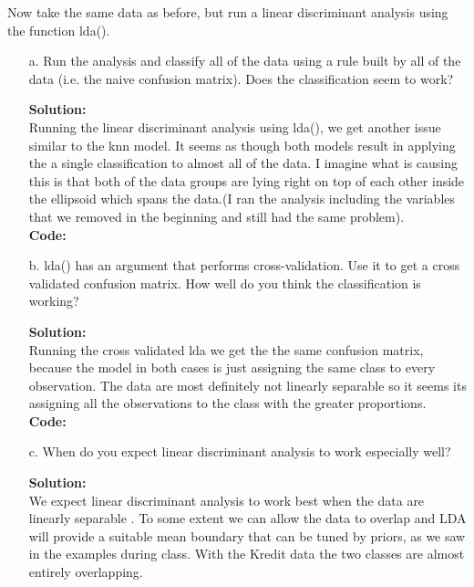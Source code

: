 \documentclass[12pt]{article}
\makeatletter
\theoremstyle{homework}
\newenvironment{exercise}[1]
{\def\@currentlabel{#1}\exercisecore}
{\endexercisecore}
\newcommand{\localhead}[1]{\par\smallskip\noindent\textbf{#1}\nobreak\\}%
\newcommand\solution{\localhead{Solution:}}
\makeatother
\begin{document}
\begin{exercise}{2.} Now take the same data as before, but run a linear discriminant analysis using the function lda().\\
  \begin{enumerate}
    \item[a.] Run the analysis and classify all of the data using a rule built by all of the data (i.e. the naive confusion matrix). Does the classification seem
    to work?\\
    \solution Running the linear discriminant analysis using lda(), we get another issue similar to the knn model. It seems as though both models result in applying the a single classification to almost all of 
    the data. I imagine what is causing this is that both of the data groups are lying right on top of each other inside the ellipsoid which spans the data.(I ran the analysis including the variables that we removed in the beginning and still had the same problem). \\
    \textbf{Code:}
      \begin{center}
      
      \end{center}
    \vspace{.15in}

    \item[b.] lda() has an argument that performs cross-validation. Use it to get a cross validated confusion matrix. How well do you think the classification
    is working?\\
    \solution Running the cross validated lda we get the the same confusion matrix, because the model in both cases is just assigning the same class to every observation. The data are most definitely not linearly separable
    so it seems its assigning all the observations to the class with the greater proportions.\\
    \textbf{Code:}
      \begin{center}
      
      \end{center}
    \vspace{.15in}

    \item[c.] When do you expect linear discriminant analysis to work especially well?\\
    \solution We expect linear discriminant analysis to work best when the data are linearly separable . To some extent we can allow the data to overlap and 
    LDA will provide a suitable mean boundary that can be tuned by priors, as we saw in the examples during class. With the Kredit data the two classes are almost entirely overlapping. 
  \end{enumerate} 
\end{exercise}
\end{document}
